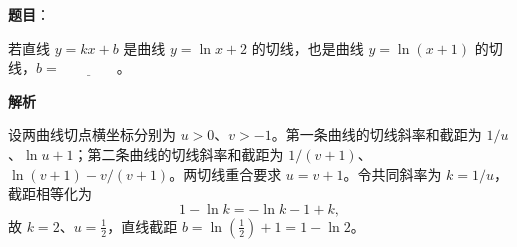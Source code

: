 \begin{answer}

\textbf{题目}：

若直线 \(y=kx+b\) 是曲线 \(y=\ln x+2\) 的切线，也是曲线 \(y=\ln(x+1)\) 的切线，\(b=\underline{\qquad\qquad}\)。

\textbf{解析}

设两曲线切点横坐标分别为 \(u>0\)、\(v>-1\)。第一条曲线的切线斜率和截距为 \(1/u\)、\(\ln u+1\)；第二条曲线的切线斜率和截距为 \(1/(v+1)\)、\(\ln(v+1)-v/(v+1)\)。两切线重合要求 \(u=v+1\)。令共同斜率为 \(k=1/u\)，截距相等化为
\nopagebreak[4]
\[
1-\ln k=-\ln k-1+k,
\]
故 \(k=2\)、\(u=\frac12\)，直线截距 \(b=\ln(\frac12)+1=1-\ln2\)。


\end{answer}

